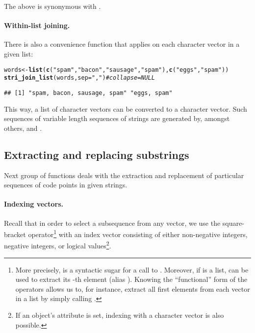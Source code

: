\documentclass[nojss]{jss}\usepackage[]{graphicx}\usepackage[]{xcolor}
\makeatletter
\newcommand{\hlstr}[1]{\textcolor[rgb]{0.192,0.494,0.8}{#1}}%
\newcommand{\hlcom}[1]{\textcolor[rgb]{0.678,0.584,0.686}{\textit{#1}}}%
\newcommand{\hlstd}[1]{\textcolor[rgb]{0.345,0.345,0.345}{#1}}%
\newcommand{\hlkwb}[1]{\textcolor[rgb]{0.69,0.353,0.396}{#1}}%
\newcommand{\hlkwc}[1]{\textcolor[rgb]{0.333,0.667,0.333}{#1}}%
\newcommand{\hlkwd}[1]{\textcolor[rgb]{0.737,0.353,0.396}{\textbf{#1}}}%
\newenvironment{kframe}{%
 \def\at@end@of@kframe{}%
 \ifinner\ifhmode%
  \def\at@end@of@kframe{\end{minipage}}%
  \begin{minipage}{\columnwidth}%
 \fi\fi%
 \def\FrameCommand##1{\hskip\@totalleftmargin \hskip-\fboxsep
 \colorbox{shadecolor}{##1}\hskip-\fboxsep
     \hskip-\linewidth \hskip-\@totalleftmargin \hskip\columnwidth}%
 \MakeFramed {\advance\hsize-\width
   \@totalleftmargin\z@ \linewidth\hsize
   \@setminipage}}%
 {\par\unskip\endMakeFramed%
 \at@end@of@kframe}
\newenvironment{knitrout}{}{} %
\makeatother
\begin{document}
The above is synonymous with .


\paragraph{Within-list joining.}
There is also a convenience function that applies 
on each character vector in a given list:

\begin{knitrout}
\color{fgcolor}\begin{kframe}
\begin{alltt}
\hlstd{words} \hlkwb{<-} \hlkwd{list}\hlstd{(}\hlkwd{c}\hlstd{(}\hlstr{"spam"}\hlstd{,} \hlstr{"bacon"}\hlstd{,} \hlstr{"sausage"}\hlstd{,} \hlstr{"spam"}\hlstd{),} \hlkwd{c}\hlstd{(}\hlstr{"eggs"}\hlstd{,} \hlstr{"spam"}\hlstd{))}
\hlkwd{stri_join_list}\hlstd{(words,} \hlkwc{sep}\hlstd{=}\hlstr{", "}\hlstd{)}  \hlcom{# collapse=NULL}
\end{alltt}
\begin{verbatim}
## [1] "spam, bacon, sausage, spam" "eggs, spam"
\end{verbatim}
\end{kframe}
\end{knitrout}



\noindent
This way, a list of character vectors can be converted to
a character vector. Such sequences of variable length sequences of
strings are generated by, amongst others,
 and .






\subsection{Extracting and replacing substrings}

Next group of functions deals with the extraction and replacement
of particular sequences of code points in given strings.

\paragraph{Indexing vectors.}
Recall that in order to select a subsequence from any  vector,
we use the square-bracket operator\footnote{More precisely, 
is a syntactic sugar for a call to \code{`[`(x, i)}.
Moreover, if  is a list,  can be used to
extract its -th element (alias \code{`[[`(x, i)}).
Knowing the ``functional'' form of the operators allows us to, for instance,
extract all first elements from each vector in a list
by simply calling \code{sapply(x, "[[", 1)}.}
with an index vector consisting of either
non-negative integers, negative integers,
or logical values\footnote{If an object's  attribute is set,
indexing with a character vector is also possible.}.
\end{document}
